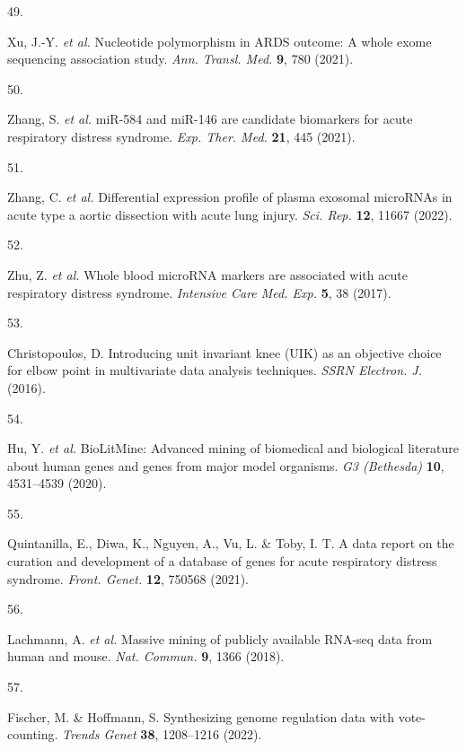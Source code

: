 \documentclass[
  11,
  a4paper,
]{article}
\newlength{\cslhangindent}
\newlength{\csllabelwidth}
\newlength{\cslentryspacingunit} %
\newenvironment{CSLReferences}[2] %
 {%
  \setlength{\parindent}{0pt}
  \ifodd #1
  \let\oldpar\par
  \def\par{\hangindent=\cslhangindent\oldpar}
  \fi
  \setlength{\parskip}{#2\cslentryspacingunit}
 }%
 {}
\newcommand{\CSLLeftMargin}[1]{\parbox[t]{\csllabelwidth}{#1}}
\newcommand{\CSLRightInline}[1]{\parbox[t]{\linewidth - \csllabelwidth}{#1}\break}
\begin{document}
\begin{CSLReferences}{0}{0}
\leavevmode{}%
\CSLLeftMargin{49. }%
\CSLRightInline{Xu, J.-Y. \emph{et al.} Nucleotide polymorphism in
{ARDS} outcome: A whole exome sequencing association study. \emph{Ann.
Transl. Med.} \textbf{9}, 780 (2021).}

\leavevmode{}%
\CSLLeftMargin{50. }%
\CSLRightInline{Zhang, S. \emph{et al.} miR-584 and miR-146 are
candidate biomarkers for acute respiratory distress syndrome. \emph{Exp.
Ther. Med.} \textbf{21}, 445 (2021).}

\leavevmode{}%
\CSLLeftMargin{51. }%
\CSLRightInline{Zhang, C. \emph{et al.} Differential expression profile
of plasma exosomal {microRNAs} in acute type a aortic dissection with
acute lung injury. \emph{Sci. Rep.} \textbf{12}, 11667 (2022).}

\leavevmode{}%
\CSLLeftMargin{52. }%
\CSLRightInline{Zhu, Z. \emph{et al.} Whole blood {microRNA} markers are
associated with acute respiratory distress syndrome. \emph{Intensive
Care Med. Exp.} \textbf{5}, 38 (2017).}

\leavevmode{}%
\CSLLeftMargin{53. }%
\CSLRightInline{Christopoulos, D. Introducing unit invariant knee
({UIK}) as an objective choice for elbow point in multivariate data
analysis techniques. \emph{SSRN Electron. J.} (2016).}

\leavevmode{}%
\CSLLeftMargin{54. }%
\CSLRightInline{Hu, Y. \emph{et al.} {BioLitMine}: Advanced mining of
biomedical and biological literature about human genes and genes from
major model organisms. \emph{G3 (Bethesda)} \textbf{10}, 4531--4539
(2020).}

\leavevmode{}%
\CSLLeftMargin{55. }%
\CSLRightInline{Quintanilla, E., Diwa, K., Nguyen, A., Vu, L. \& Toby,
I. T. A data report on the curation and development of a database of
genes for acute respiratory distress syndrome. \emph{Front. Genet.}
\textbf{12}, 750568 (2021).}

\leavevmode{}%
\CSLLeftMargin{56. }%
\CSLRightInline{Lachmann, A. \emph{et al.} Massive mining of publicly
available {RNA-seq} data from human and mouse. \emph{Nat. Commun.}
\textbf{9}, 1366 (2018).}

\leavevmode{}%
\CSLLeftMargin{57. }%
\CSLRightInline{Fischer, M. \& Hoffmann, S. {{S}ynthesizing genome
regulation data with vote-counting}. \emph{Trends Genet} \textbf{38},
1208--1216 (2022).}


\end{CSLReferences}
\end{document}

